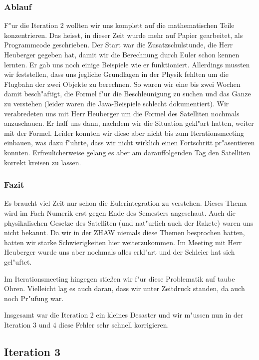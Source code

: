 \documentclass[11pt]{report}
\begin{document}
\subsubsection{Ablauf}
F"ur die Iteration 2 wollten wir uns komplett auf die mathematischen Teile konzentrieren. Das heisst, in dieser Zeit wurde mehr auf Papier gearbeitet, als Programmcode geschrieben.
Der Start war die Zusatzschulstunde, die Herr Heuberger gegeben hat, damit wir die Berechnung durch Euler schon kennen lernten. Er gab uns noch einige Beispiele wie er funktioniert.
Allerdings mussten wir feststellen, dass uns jegliche Grundlagen in der Physik fehlten um die Flugbahn der zwei Objekte zu berechnen. So waren wir eine bis zwei Wochen damit besch"aftigt, die Formel f"ur die Beschleunigung zu suchen und das Ganze zu verstehen (leider waren die Java-Beispiele schlecht dokumentiert). Wir verabredeten uns mit Herr Heuberger um die Formel des Satelliten nochmals anzuschauen. Er half uns dann, nachdem wir die Situation gekl"art hatten, weiter mit der Formel. Leider konnten wir diese aber nicht bis zum Iterationsmeeting einbauen, was dazu f"uhrte, dass wir nicht wirklich einen Fortschritt pr"asentieren konnten. Erfreulicherweise gelang es aber am darauffolgenden Tag den Satelliten korrekt kreisen zu lassen.
\subsubsection{Fazit}
Es braucht viel Zeit nur schon die Eulerintegration zu verstehen. Dieses Thema wird im Fach Numerik erst gegen Ende des Semesters angeschaut.
Auch die physikalischen Gesetze des Satelliten (und nat"urlich auch der Rakete) waren uns nicht bekannt. Da wir in der ZHAW niemals diese Themen besprochen hatten, hatten wir starke Schwierigkeiten hier weiterzukommen.
Im Meeting mit Herr Heuberger wurde uns aber nochmals alles erkl"art und der Schleier hat sich gel"uftet.
\linebreak

Im Iterationsmeeting hingegen stießen wir f"ur diese Problematik auf taube Ohren. Vielleicht lag es auch daran, dass wir unter Zeitdruck standen, da auch noch Pr"ufung war.
\linebreak

Insgesamt war die Iteration 2 ein kleines Desaster und wir m"ussen nun in der Iteration 3 und 4 diese Fehler sehr schnell korrigieren.
\newpage
\subsection{Iteration 3}
\end{document}
